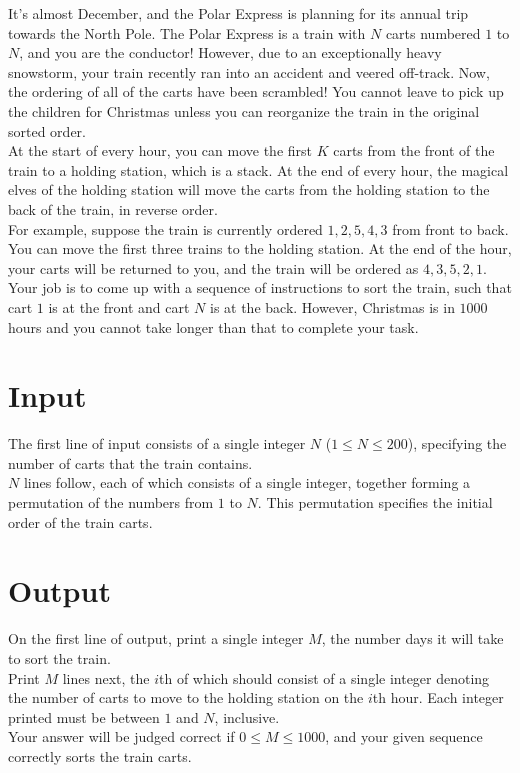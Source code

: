 
\noindent It's almost December, and the Polar Express is planning for its annual trip towards the North Pole. The Polar Express is a train with $N$ carts numbered $1$ to $N$, and you are the conductor! However, due to an exceptionally heavy snowstorm, your train recently ran into an accident and veered off-track. Now, the ordering of all of the carts have been scrambled! You cannot leave to pick up the children for Christmas unless you can reorganize the train in the original sorted order.\\

At the start of every hour, you can move the first $K$ carts from the front of the train to a holding station, which is a stack. At the end of every hour, the magical elves of the holding station will move the carts from the holding station to the back of the train, in reverse order.\\

For example, suppose the train is currently ordered $1, 2, 5, 4, 3$ from front to back. You can move the first three trains to the holding station. At the end of the hour, your carts will be returned to you, and the train will be ordered as $4, 3, 5, 2, 1$.\\

Your job is to come up with a sequence of instructions to sort the train, such that cart $1$ is at the front and cart $N$ is at the back. However, Christmas is in $1000$ hours and you cannot take longer than that to complete your task.

\section*{Input}
The first line of input consists of a single integer $N$ ($1 \leq N \leq 200$), specifying the number of carts that the train contains.\\
$N$ lines follow, each of which consists of a single integer, together forming a permutation of the numbers from $1$ to $N$. This permutation specifies the initial order of the train carts.

\section*{Output}
On the first line of output, print a single integer $M$, the number days it will take to sort the train.\\
Print $M$ lines next, the $i$th of which should consist of a single integer denoting the number of carts to move to the holding station on the $i$th hour. Each integer printed must be between $1$ and $N$, inclusive.\\
Your answer will be judged correct if $0 \leq M \leq 1000$, and your given sequence correctly sorts the train carts.

